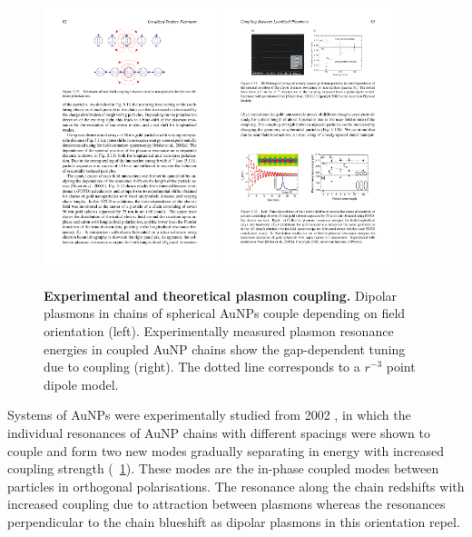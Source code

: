 \documentclass{article}
\begin{document}
\begin{figure}[bt]
\centering
\includegraphics[width=0.45\textwidth]{figures/literature/maier_plasmonics_coupling_diagram}
\quad
\includegraphics[width=0.45\textwidth]{figures/literature/maier_plasmonics_coupling}
\caption[Experimental and theoretical plasmon coupling]{\textbf{Experimental and theoretical plasmon coupling.} Dipolar plasmons in chains of spherical AuNPs couple depending on field orientation \cite{maier2007plasmonics} (left). Experimentally measured plasmon resonance energies in coupled AuNP chains show the gap-dependent tuning due to coupling \cite{maier2002} (right). The dotted line corresponds to a $r^{-3}$ point dipole model.}
\label{fig:maier_plasmon_coupling}
\end{figure}

Systems of AuNPs were experimentally studied from 2002 \cite{maier2002}, in which the individual resonances of AuNP chains with different spacings were shown to couple and form two new modes gradually separating in energy with increased coupling strength (\figurename~\ref{fig:maier_plasmon_coupling}). These modes are the in-phase coupled modes between particles in orthogonal polarisations. The resonance along the chain redshifts with increased coupling due to attraction between plasmons whereas the resonances perpendicular to the chain blueshift as dipolar plasmons in this orientation repel. %
\end{document}
